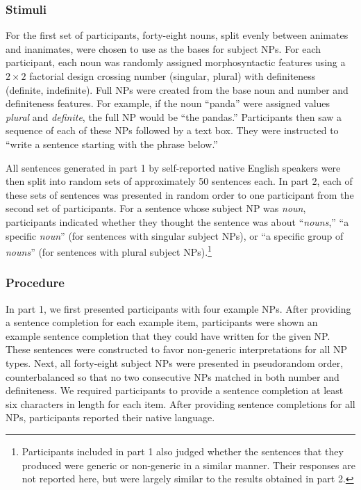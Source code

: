 \documentclass[10pt,letterpaper]{article}
\begin{document}
\subsubsection{Stimuli}  

For the first set of participants, forty-eight nouns, split evenly between animates and inanimates, were chosen to use as the bases for subject NPs. For each participant, each noun was randomly assigned morphosyntactic features using a \(2 \times 2\) factorial design crossing number (singular, plural) with definiteness (definite, indefinite). Full NPs were created from the base noun and number and definiteness features. For example, if the noun ``panda'' were assigned values \textit{plural} and \textit{definite}, the full NP would be ``the pandas.'' Participants then saw a sequence of each of these NPs followed by a text box. They were instructed to ``write a sentence starting with the phrase below.''

All sentences generated in part 1 by self-reported native English speakers were then split into random sets of approximately 50 sentences each. In part 2, each of these sets of sentences was presented in random order to one participant from the second set of participants. For a sentence whose subject NP was \textit{noun}, participants indicated whether they thought the sentence was about ``\textit{nouns},'' ``a specific \textit{noun}'' (for sentences with singular subject NPs), or ``a specific group of \textit{nouns}'' (for sentences with plural subject NPs).\footnote{Participants included in part 1 also judged whether the sentences that they produced were generic or non-generic in a similar manner. Their responses are not reported here, but were largely similar to the results obtained in part 2.}

\subsubsection{Procedure} 

In part 1, we first presented participants with four example NPs. After providing a sentence completion for each example item, participants were shown an example sentence completion that they could have written for the given NP. These sentences were constructed to favor non-generic interpretations for all NP types. Next, all forty-eight subject NPs were presented in pseudorandom order, counterbalanced so that no two consecutive NPs matched in both number and definiteness. We required participants to provide a sentence completion at least six characters in length for each item. After providing sentence completions for all NPs, participants reported their native language.
\end{document}
